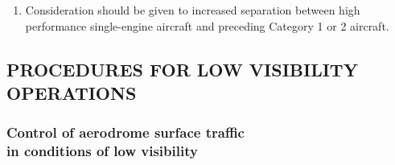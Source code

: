 \documentclass[../vATM.tex]{subfiles}
\begin{document}
\begin{enumerate}[label=\arabic{section}.\arabic{subsection}.\arabic*]
        \begin{enumerate}[label=\arabic{section}.\arabic{subsection}.\arabic{enumi}.\arabic*]
            \item Consideration should be given to increased separation between high performance single-engine aircraft and preceding Category 1 or 2 aircraft.
        \end{enumerate}
    \end{enumerate}

    \subsection[Procedures for low visibility operations]{PROCEDURES FOR LOW VISIBILITY OPERATIONS}

    \subsubsection[Control of aerodrome surface traffic in conditions of low visibility]{Control of aerodrome surface traffic \\ in conditions of low visibility}

    \begin{enumempty}[labelindent=\parindent]
        \item {}
    \end{enumempty}
\end{document}
